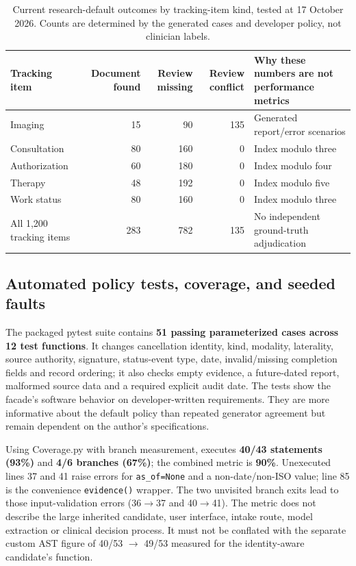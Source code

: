 \documentclass[11pt,twocolumn]{article}
\newcommand{\code}[1]{\texttt{#1}}
\begin{document}
\begin{table}[t]\centering\scriptsize\caption{Current research-default outcomes by tracking-item kind, tested at 17 October 2026. Counts are determined by the generated cases and developer policy, not clinician labels.}\label{tab:policycounts}
\begin{tabular}{@{}p{}rrrp{}@{}}\toprule
Tracking item & Document found & Review missing & Review conflict & Why these numbers are not performance metrics \\\midrule
Imaging & 15 & 90 & 135 & Generated report/error scenarios \\
Consultation & 80 & 160 & 0 & Index modulo three \\
Authorization & 60 & 180 & 0 & Index modulo four \\
Therapy & 48 & 192 & 0 & Index modulo five \\
Work status & 80 & 160 & 0 & Index modulo three \\\midrule
All 1,200 tracking items & 283 & 782 & 135 & No independent ground-truth adjudication \\\bottomrule
\end{tabular}
\end{table}

\subsection{Automated policy tests, coverage, and seeded faults}
The packaged pytest suite contains \textbf{51 passing parameterized cases across 12 test functions}. It changes cancellation identity, kind, modality, laterality, source authority, signature, status-event type, date, invalid/missing completion fields and record ordering; it also checks empty evidence, a future-dated report, malformed source data and a required explicit audit date. The tests show the facade's software behavior on developer-written requirements. They are more informative about the default policy than repeated generator agreement but remain dependent on the author's specifications.

Using Coverage.py with branch measurement,  executes \textbf{40/43 statements (93\%)} and \textbf{4/6 branches (67\%)}; the combined metric is \textbf{90\%}. Unexecuted lines 37 and 41 raise errors for \code{as\_of=None} and a non-date/non-ISO value; line 85 is the convenience \code{evidence()} wrapper. The two unvisited branch exits lead to those input-validation errors (36$\to$37 and 40$\to$41). The metric does not describe the large inherited candidate, user interface, intake route, model extraction or clinical decision process. It must not be conflated with the separate custom AST figure of 40/53 $\to$ 49/53 measured for the identity-aware candidate's function.
\end{document}
